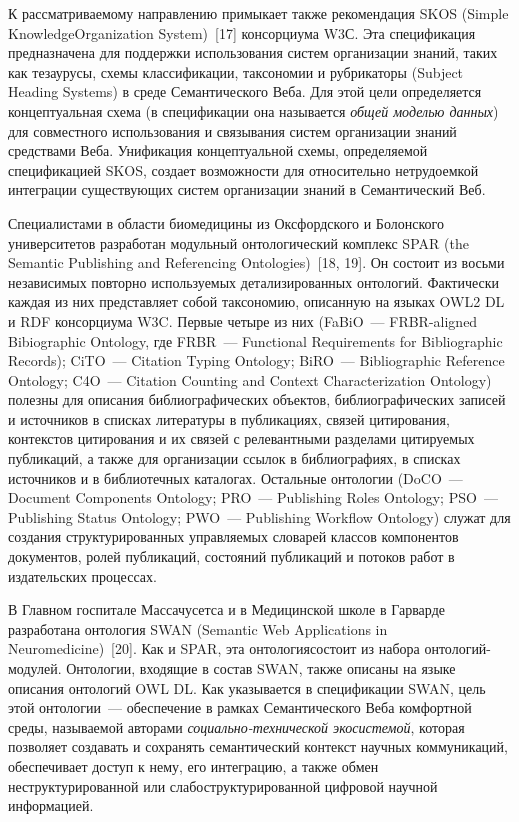 \begin{multicols}{2}
  К рассматриваемому направлению примыкает также рекомендация 
{SKOS} ({Simple Knowledge\linebreak Organization System})~[17] консорциума 
{W3С}. Эта спецификация предназначена для поддержки использования 
систем организации знаний, таких как тезаурусы, схемы классификации, 
таксономии и руб\-ри\-ка\-то\-ры ({Subject Heading Systems}) в среде 
Семантического Веба. Для этой цели определяется концептуальная схема (в 
спецификации она называется \textit{общей моделью данных}) для совместного 
использования и связывания систем организации знаний средствами Веба. 
Унификация концептуальной схемы, определяемой спецификацией 
{SKOS}, создает возможности для относительно нетрудоемкой интеграции 
существующих систем организации знаний в Семантический Веб. 
  
  Специалистами в области биомедицины из Оксфордского и Болонского 
университетов разработан модульный онтологический комплекс {SPAR} 
({the Semantic Publishing and Referencing Ontologies})~[18, 19]. Он состоит 
из восьми независимых повторно используемых детализированных онтологий. 
Фактически каждая из них представляет собой таксономию, описанную на 
языках {OWL2 DL} и {RDF} консорциума {W3C}. Первые 
четыре из них (FaBiO~--- FRBR-aligned Bibiographic Ontology,
где FRBR~--- Functional Requirements for Bibliographic Records);
CiTO~--- Citation Typing Ontology;
BiRO~--- Bibliographic Reference Ontology;  C4O~--- Citation Counting and Context
Characterization Ontology) 
полезны для описания библиографических объектов, библиографических 
записей и источников в списках литературы в пуб\-ли\-ка\-ци\-ях, связей 
цитирования, контекстов цитирования и их связей с релевантными разделами 
цитируемых пуб\-ли\-ка\-ций, а также для организации ссылок в библиографиях, в 
списках источников и в биб\-лио\-теч\-ных каталогах. Остальные онтологии 
(DoCO~--- Document Components Ontology; PRO~--- Publishing Roles Ontology;
PSO~--- Publishing Status Ontology; PWO~--- Publishing Workflow Ontology) служат для создания 
структурированных управляемых словарей классов компонентов документов, 
ролей пуб\-ли\-ка\-ций, со\-сто\-яний пуб\-ли\-ка\-ций и потоков работ в издательских 
процессах.
  
  В Главном госпитале Массачусетса и в Медицинской школе в Гарварде 
разработана онтология {SWAN} ({Semantic Web Applications in 
Neuromedicine})~[20]. Как и {SPAR}, эта онтология\linebreak состоит из набора 
он\-то\-ло\-гий-мо\-ду\-лей. Онтологии, входящие в состав {SWAN}, также 
описаны на языке описания онтологий {OWL DL}. Как указывается в 
спецификации {SWAN}, цель этой онтологии~--- обеспечение в рамках 
Семантического Веба комфортной среды, называемой авторами 
  \textit{со\-ци\-аль\-но-тех\-ни\-че\-ской экосистемой}, которая позволяет 
создавать и сохранять семантический контекст научных коммуникаций, 
обеспечивает доступ к нему, его интеграцию, а также обмен 
неструктурированной или слабоструктурированной цифровой научной 
информацией.
  

\end{multicols}
